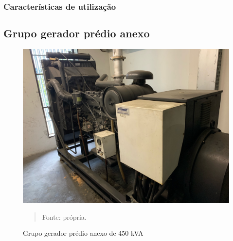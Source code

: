 \subsubsection{Características de utilização}

\subsection{Grupo gerador prédio anexo}

\begin{figure}[H]
\begin{center}
			\caption{Grupo gerador prédio anexo de 450 kVA}
			\includegraphics[width=.9\textwidth]{Figuras/gerador_450.jpeg}
            \vspace*{\fill} 
            \begin{quote} 
            \centering 
            Fonte: própria.
            \end{quote}
            \vspace*{\fill}
			\label{fig:gerador750}
\end{center}
\end{figure}
